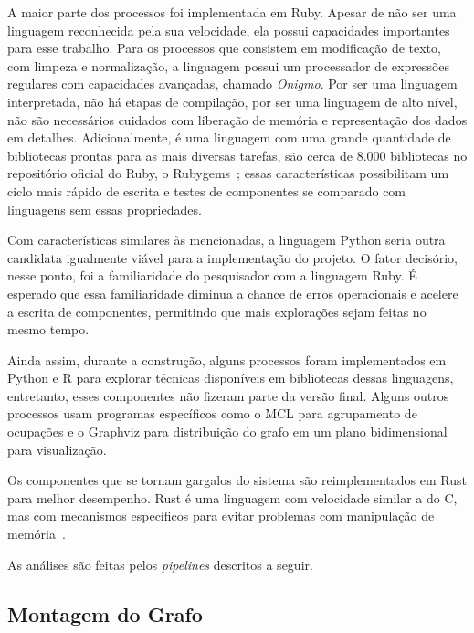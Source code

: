 \documentclass[12pt,a4paper]{article}
\begin{document}
A maior parte dos processos foi implementada em Ruby. Apesar de não ser uma linguagem reconhecida pela sua velocidade, ela possui capacidades importantes para esse trabalho. Para os processos que consistem em modificação de texto, com limpeza e normalização, a linguagem possui um processador de expressões regulares com capacidades avançadas, chamado \textit{Onigmo}. Por ser uma linguagem interpretada, não há etapas de compilação, por ser uma linguagem de alto nível, não são necessários cuidados com liberação de memória e representação dos dados em detalhes. Adicionalmente, é uma linguagem com uma grande quantidade de bibliotecas prontas para as mais diversas tarefas, são cerca de 8.000 bibliotecas no repositório oficial do Ruby, o Rubygems~\cite{rubygems-ud}; essas características possibilitam um ciclo mais rápido de escrita e testes de componentes se comparado com linguagens sem essas propriedades.

Com características similares às mencionadas, a linguagem Python seria outra candidata igualmente viável para a implementação do projeto. O fator decisório, nesse ponto, foi a familiaridade do pesquisador com a linguagem Ruby. É esperado que essa familiaridade diminua a chance de erros operacionais e acelere a escrita de componentes, permitindo que mais explorações sejam feitas no mesmo tempo.

Ainda assim, durante a construção, alguns processos foram implementados em Python e R para explorar técnicas disponíveis em bibliotecas dessas linguagens, entretanto, esses componentes não fizeram parte da versão final. Alguns outros processos usam programas específicos como o MCL para agrupamento de ocupações e o Graphviz para distribuição do grafo em um plano bidimensional para visualização.

Os componentes que se tornam gargalos do sistema são reimplementados em Rust para melhor desempenho. Rust é uma linguagem com velocidade similar a do C, mas com mecanismos específicos para evitar problemas com manipulação de memória~\cite{rustfaq-ys}.

As análises são feitas pelos \textit{pipelines} descritos a seguir.


\subsection{Montagem do Grafo} \label{sec:montagem-grafo}
\end{document}
